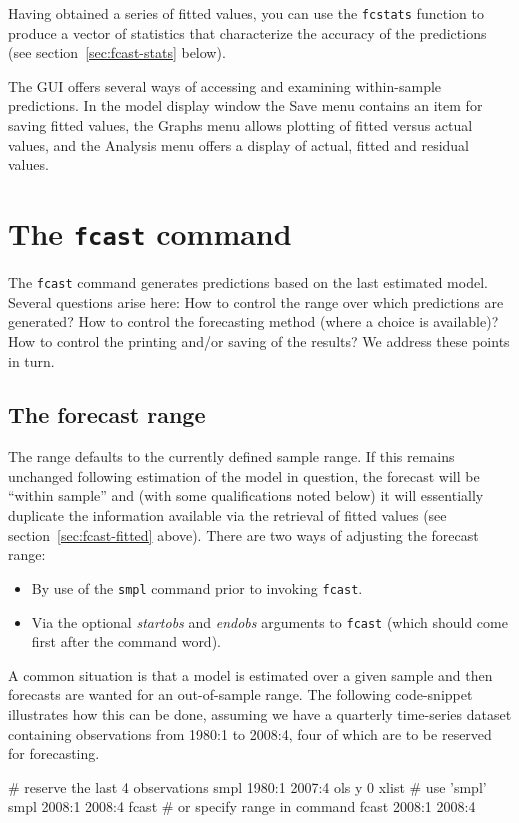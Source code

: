Having obtained a series of fitted values, you can use the
\texttt{fcstats} function to produce a vector of statistics that
characterize the accuracy of the predictions (see
section~\ref{sec:fcast-stats} below).

The  GUI offers several ways of accessing and examining
within-sample predictions.  In the model display window the
\textsf{Save} menu contains an item for saving fitted values, the
\textsf{Graphs} menu allows plotting of fitted versus actual values,
and the \textsf{Analysis} menu offers a display of actual, fitted and
residual values.


\section{The \texttt{fcast} command}
\label{sec:fcast-fcast}

The \texttt{fcast} command generates predictions based on the last
estimated model.  Several questions arise here: How to control the
range over which predictions are generated?  How to control the
forecasting method (where a choice is available)?  How to control the
printing and/or saving of the results?  We address these points in
turn.

\subsection{The forecast range}

The range defaults to the currently defined sample range.  If this
remains unchanged following estimation of the model in question, the
forecast will be ``within sample'' and (with some qualifications noted
below) it will essentially duplicate the information available via the
retrieval of fitted values (see section~\ref{sec:fcast-fitted} above).
There are two ways of adjusting the forecast range:
%
\begin{itemize}
\item By use of the \texttt{smpl} command prior to invoking
  \texttt{fcast}.
\item Via the optional \textsl{startobs} and \textsl{endobs} arguments
  to \texttt{fcast} (which should come first after the command word).
\end{itemize}

A common situation is that a model is estimated over a given sample
and then forecasts are wanted for an out-of-sample range.  The
following code-snippet illustrates how this can be done, assuming we
have a quarterly time-series dataset containing observations from
1980:1 to 2008:4, four of which are to be reserved for forecasting.
%
\begin{code}
# reserve the last 4 observations
smpl 1980:1 2007:4
ols y 0 xlist
# use 'smpl'
smpl 2008:1 2008:4
fcast
# or specify range in command
fcast 2008:1 2008:4
\end{code}

